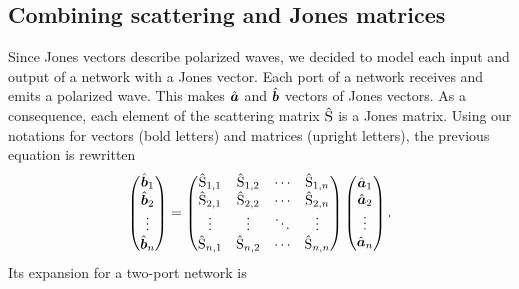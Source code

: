 \subsection{Combining scattering and Jones matrices}
Since Jones vectors describe polarized waves, we decided to model each input and output of a network with a Jones vector.
Each port of a network receives and emits a polarized wave.
This makes $\hat{\bm{a}}$ and $\hat{\bm{b}}$ vectors of Jones vectors.
As a consequence, each element of the scattering matrix $\hat{\mathrm{S}}$ is a Jones matrix.
Using our notations for vectors (bold letters) and matrices (upright letters), the previous equation is rewritten
\begin{equation}
        \begin{pmatrix}
            \hat{\bm{b}}_1\\
            \hat{\bm{b}}_2\\
            \vdots\\
            \hat{\bm{b}}_n
        \end{pmatrix}
    =
        \begin{pmatrix}
            \hat{\mathrm{S}}_{1, 1} & \hat{\mathrm{S}}_{1, 2} & \cdots & \hat{\mathrm{S}}_{1, n} \\
            \hat{\mathrm{S}}_{2, 1} & \hat{\mathrm{S}}_{2, 2} & \cdots & \hat{\mathrm{S}}_{2, n} \\
            \vdots   & \vdots   & \ddots & \vdots   \\
            \hat{\mathrm{S}}_{n, 1} & \hat{\mathrm{S}}_{n, 2} & \cdots & \hat{\mathrm{S}}_{n, n}
        \end{pmatrix}
        \begin{pmatrix}
            \hat{\bm{a}}_1\\
            \hat{\bm{a}}_2\\
            \vdots\\
            \hat{\bm{a}}_n
        \end{pmatrix}
    \text{.}
\end{equation}
Its expansion for a two-port network is
